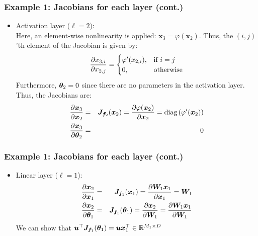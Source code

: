 \documentclass[smaller, handout]{beamer}
\begin{document}
\begin{frame}
  \frametitle{Example 1: Jacobians for each layer (cont.)}\pause
\begin{itemize}
\setcounter{enumi}{2}
  \item Activation layer ($\ell = 2$):\\
  Here, an element-wise nonlinearity is applied: $\bm x_3 = \varphi(\bm x_2)$. Thus, the $(i,j)$'th element of the Jacobian is given by:
  \begin{equation}
    \frac{\partial{x_{3,i}}}{\partial{x_{2,j}}} = \begin{cases}
      \varphi'(x_{2,i}), & \text{if } i = j \\
      0, & \text{otherwise}
    \end{cases}
  \end{equation}\pause
    Furthermore, $\bm{\theta}_2 = 0$ since there are no parameters in the activation layer. Thus, the Jacobians are: \pause
    \begin{eqnarray}
    \frac{\partial{\bm x_3}}{\partial{\bm x_2}} &=& \bm J_{\bm f_2}(\bm x_2) = \frac{\partial{\varphi(\bm x_2)}}{\partial{\bm x_2}} = \text{diag}\left(\varphi'(\bm x_2)\right) \\
    \frac{\partial{\bm x_3}}{\partial{\bm{\theta}_2}} &=& 0
  \end{eqnarray}
\end{itemize} 
\end{frame}


\begin{frame}
  \frametitle{Example 1: Jacobians for each layer (cont.)}\pause
\begin{itemize}
\setcounter{enumi}{3}
  \item Linear layer ($\ell = 1$):
    \begin{eqnarray}
    \pd{\bm x_2}{\bm x_1} &=& \bm J_{\bm f_1}(\bm x_1) = \pd{\bm W_1 \bm x_1}{\bm x_1} = \bm W_1 \\
    \pd{\bm x_2}{\bm \th_1} &=& \bm J_{\bm f_1}(\bm \th_1) = \pd{\bm x_2}{\bm W_1} = \pd{\bm W_1 \bm x_1}{\bm W_1} %
  \end{eqnarray}  
  We can show that $\bm u^{\top} \bm J_{\bm f_1}(\bm {\theta}_1) = \bm u \bm x_1^{\top} \in \mathbb{R}^{M_1 \times D}$
\end{itemize} 
\end{frame}
\end{document}
